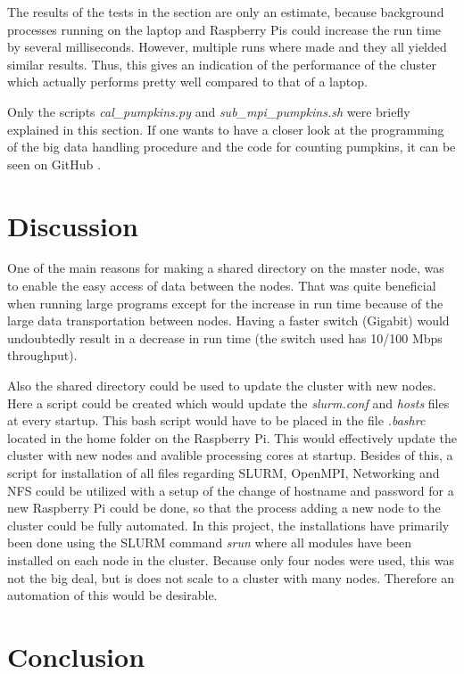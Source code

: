 \documentclass[../Head/Report.tex]{subfiles}
\begin{document}
The results of the tests in the section are only an estimate, because background processes running on the laptop and Raspberry Pis could increase the run time by several milliseconds. However, multiple runs where made and they all yielded similar results. Thus, this gives an indication of the performance of the cluster which actually performs pretty well compared to that of a laptop. 

Only the scripts \textit{cal\_pumpkins.py} and \textit{sub\_mpi\_pumpkins.sh} were briefly explained in this section. If one wants to have a closer look at the programming of the big data handling procedure and the code for counting pumpkins, it can be seen on GitHub \cite{kenni_github}. 
 
\section{Discussion}
One of the main reasons for making a shared directory on the master node, was to enable the easy access of data between the nodes. That was quite beneficial when running large programs except for the increase in run time because of the large data transportation between nodes. Having a faster switch (Gigabit) would undoubtedly result in a decrease in run time (the switch used has 10/100 Mbps throughput).  

Also the shared directory could be used to update the cluster with new nodes. Here a script could be created which would update the \textit{slurm.conf} and \textit{hosts} files at every startup. This bash script would have to be placed in the file \textit{.bashrc} located in the home folder on the Raspberry Pi. This would effectively update the cluster with new nodes and avalible processing cores at startup. Besides of this, a script for installation of all files regarding SLURM, OpenMPI, Networking and NFS could be utilized with a setup of the change of hostname and password for a new Raspberry Pi could be done, so that the process adding a new node to the cluster could be fully automated. In this project, the installations have primarily been done using the SLURM command \textit{srun} where all modules have been installed on each node in the cluster. Because only four nodes were used, this was not the big deal, but is does not scale to a cluster with many nodes. Therefore an automation of this would be desirable.  

 

   


\section{Conclusion}
\end{document}
